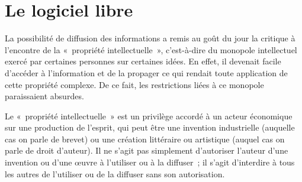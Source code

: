 
\section*{Le logiciel libre} %

La possibilité de diffusion des informations a remis au goût du jour la critique à l'encontre de la «~propriété intellectuelle~», c'est-à-dire du monopole intellectuel exercé par certaines personnes sur certaines idées. En effet, il devenait facile d'accéder à l'information et de la propager ce qui rendait toute application de cette propriété complexe. De ce fait, les restrictions liées à ce monopole paraissaient absurdes. %

Le «~propriété intellectuelle~» est un privilège accordé à un acteur économique sur une production de l'esprit, qui peut être une invention industrielle (auquelle cas on parle de brevet) ou une création littéraire ou artistique (auquel cas on parle de droit d'auteur). Il ne s'agit pas simplement d'autoriser l'auteur d'une invention ou d'une œuvre à l'utiliser ou à la diffuser~; il s'agit d'interdire à tous les autres de l'utiliser ou de la diffuser sans son autorisation.

